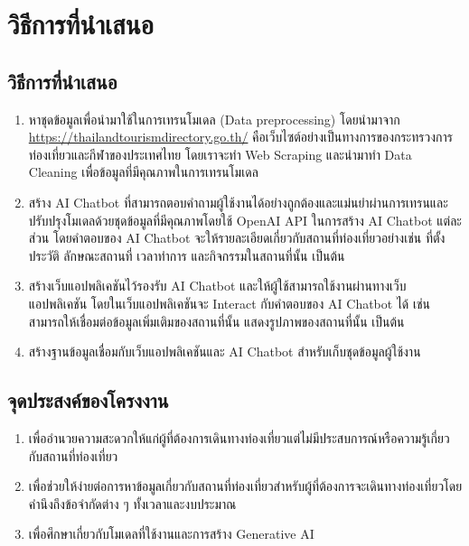 \documentclass[12pt,oneside,openright,a4paper]{cpe-thai-project}
\begin{document}
\section{วิธีการที่นำเสนอ}
\subsection{วิธีการที่นำเสนอ}
\begin{enumerate}
\item  หาชุดข้อมูลเพื่อนำมาใช้ในการเทรนโมเดล (Data preprocessing) โดยนำมาจาก \href{https://thailandtourismdirectory.go.th/} {https://thailandtourismdirectory.go.th/} คือเว็บไซต์อย่างเป็นทางการของกระทรวงการท่องเที่ยวและกีฬาของประเทศไทย โดยเราจะทำ Web Scraping และนำมาทำ Data Cleaning เพื่อข้อมูลที่มีคุณภาพในการเทรนโมเดล
\item  สร้าง AI Chatbot ที่สามารถตอบคำถามผู้ใช้งานได้อย่างถูกต้องและแม่นยำผ่านการเทรนและปรับปรุงโมเดลด้วยชุดข้อมูลที่มีคุณภาพโดยใช้ OpenAI API ในการสร้าง AI Chatbot แต่ละส่วน โดยคำตอบของ AI Chatbot จะให้รายละเอียดเกี่ยวกับสถานที่ท่องเที่ยวอย่างเช่น ที่ตั้ง ประวัติ ลักษณะสถานที่ เวลาทำการ และกิจกรรมในสถานที่นั้น เป็นต้น
\item  สร้างเว็บแอปพลิเคชันไว้รองรับ AI Chatbot และให้ผู้ใช้สามารถใช้งานผ่านทางเว็บแอปพลิเคชัน โดยในเว็บแอปพลิเคชันจะ Interact กับคำตอบของ AI Chatbot ได้ เช่น สามารถให้เชื่อมต่อข้อมูลเพิ่มเติมของสถานที่นั้น แสดงรูปภาพของสถานที่นั้น เป็นต้น
\item  สร้างฐานข้อมูลเชื่อมกับเว็บแอปพลิเคชันและ AI Chatbot สำหรับเก็บชุดข้อมูลผู้ใช้งาน
\end{enumerate} \newpage

\subsection{จุดประสงค์ของโครงงาน}
\begin{enumerate}
\item  เพื่ออำนวยความสะดวกให้แก่ผู้ที่ต้องการเดินทางท่องเที่ยวแต่ไม่มีประสบการณ์หรือความรู้เกี่ยวกับสถานที่ท่องเที่ยว
\item  เพื่อช่วยให้ง่ายต่อการหาข้อมูลเกี่ยวกับสถานที่ท่องเที่ยวสำหรับผู้ที่ต้องการจะเดินทางท่องเที่ยวโดยคำนึงถึงข้อจำกัดต่าง ๆ ทั้งเวลาและงบประมาณ
\item  เพื่อศึกษาเกี่ยวกับโมเดลที่ใช้งานและการสร้าง Generative AI
\end{enumerate}
\end{document}
